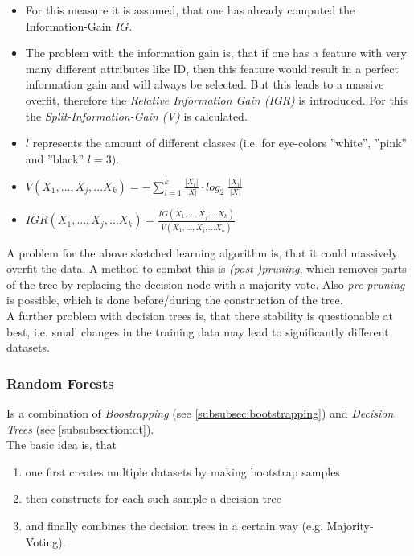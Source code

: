 \documentclass[12pt,a4paper]{article}
\begin{document}
\begin{itemize}
\begin{itemize}
            \item For this measure it is assumed, that one has already computed the Information-Gain \(IG\).
            \item The problem with the information gain is, that if one has a feature with very many different attributes like ID, then this feature would result in a perfect information gain and will always be selected. But this leads to a massive overfit, therefore the \textit{Relative Information Gain (IGR)} is introduced. For this the \textit{Split-Information-Gain (V)} is calculated.
            \item \(l\) represents the amount of different classes (i.e. for eye-colors ''white'', ''pink'' and ''black'' \(l = 3\)).
            \item \(V(X_1,...,X_j,...X_k) = - \sum_{i=1}^k \frac{|X_i|}{|X|} \cdot log_2 \;  \frac{|X_i|}{|X|}\)
            \item \(IGR(X_1,...,X_j,...X_k) = \frac{IG(X_1,...,X_j,...X_k)}{V(X_1,...,X_j,...X_k)}\)
        \end{itemize}
\end{itemize}

\noindent A problem for the above sketched learning algorithm is, that it could massively overfit the data. A method to combat this is \textit{(post-)pruning}, which removes parts of the tree by replacing the decision node with a majority vote. Also \textit{pre-pruning} is possible, which is done before/during the construction of the tree.\\
A further problem with decision trees is, that there stability is questionable at best, i.e. small changes in the training data may lead to significantly different datasets.

\subsubsection{Random Forests}

\noindent Is a combination of \textit{Boostrapping} (see \ref{subsubsec:bootstrapping}) and \textit{Decision Trees} (see \ref{subsubsection:dt}).\\
The basic idea is, that

\begin{enumerate}
    \item one first creates multiple datasets by making bootstrap samples
    \item then constructs for each such sample a decision tree
    \item and finally combines the decision trees in a certain way (e.g. Majority-Voting). 
\end{enumerate}
\end{document}

